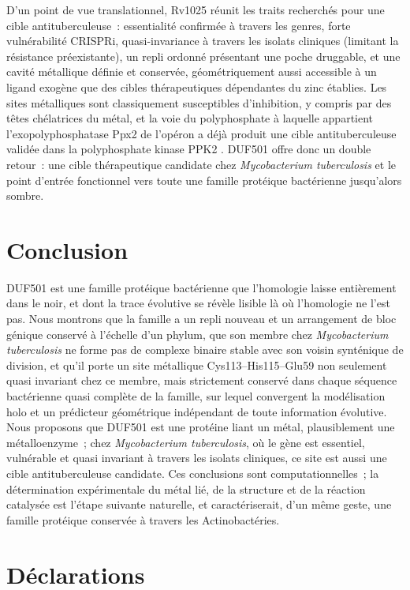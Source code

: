 \documentclass[11pt,a4paper]{article}
\newcommand{\mtb}{\textit{Mycobacterium tuberculosis}}
\begin{document}
D'un point de vue translationnel, Rv1025 réunit les traits recherchés pour une cible antituberculeuse~: essentialité confirmée à travers les genres, forte vulnérabilité CRISPRi, quasi-invariance à travers les isolats cliniques (limitant la résistance préexistante), un repli ordonné présentant une poche druggable, et une cavité métallique définie et conservée, géométriquement aussi accessible à un ligand exogène que des cibles thérapeutiques dépendantes du zinc établies. Les sites métalliques sont classiquement susceptibles d'inhibition, y compris par des têtes chélatrices du métal, et la voie du polyphosphate à laquelle appartient l'exopolyphosphatase Ppx2 de l'opéron a déjà produit une cible antituberculeuse validée dans la polyphosphate kinase PPK2 \citep{singh2016ppk2target}. DUF501 offre donc un double retour~: une cible thérapeutique candidate chez \mtb{} et le point d'entrée fonctionnel vers toute une famille protéique bactérienne jusqu'alors sombre.

\section{Conclusion}

DUF501 est une famille protéique bactérienne que l'homologie laisse entièrement dans le noir, et dont la trace évolutive se révèle lisible là où l'homologie ne l'est pas. Nous montrons que la famille a un repli nouveau et un arrangement de bloc génique conservé à l'échelle d'un phylum, que son membre chez \mtb{} ne forme pas de complexe binaire stable avec son voisin synténique de division, et qu'il porte un site métallique Cys113--His115--Glu59 non seulement quasi invariant chez ce membre, mais strictement conservé dans chaque séquence bactérienne quasi complète de la famille, sur lequel convergent la modélisation holo et un prédicteur géométrique indépendant de toute information évolutive. Nous proposons que DUF501 est une protéine liant un métal, plausiblement une métalloenzyme~; chez \mtb{}, où le gène est essentiel, vulnérable et quasi invariant à travers les isolats cliniques, ce site est aussi une cible antituberculeuse candidate. Ces conclusions sont computationnelles~; la détermination expérimentale du métal lié, de la structure et de la réaction catalysée est l'étape suivante naturelle, et caractériserait, d'un même geste, une famille protéique conservée à travers les Actinobactéries.

\section*{Déclarations}
\end{document}
